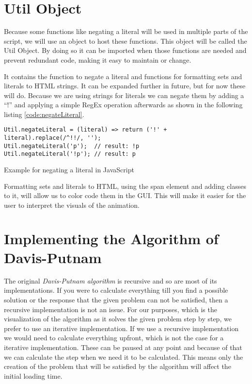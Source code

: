 \section{Util Object}
\label{sec:impUtil}
Because some functions like negating a literal will be used in multiple parts of the script, we will use an object to host these functions. This object will be called the Util Object. By doing so it can be imported when those functions are needed and prevent redundant code, making it easy to maintain or change.

It contains the function to negate a literal and functions for formatting sets and literals to HTML strings. It can be expanded further in future, but for now these will do.
Because we are using strings for literals we can negate them by adding a ``!'' and applying a simple RegEx operation afterwards as shown in the following listing \ref{code:negateLiteral}.

\begin{listing}[h!]
\begin{verbatim}
Util.negateLiteral = (literal) => return ('!' + literal).replace(/^!!/, '');
Util.negateLiteral('p');  // result: !p
Util.negateLiteral('!p'); // result: p
\end{verbatim}
    \caption{Example for negating a literal in JavaScript}
    \label{code:negateLiteral}
\end{listing}

Formatting sets and literals to HTML, using the span element and adding classes to it, will allow us to color code them in the GUI. This will make it easier for the user to interpret the visuals of the animation.

\section{Implementing the Algorithm of Davis-Putnam}
\label{sec:impDavisPutnam}
The original \textit{Davis-Putnam algorithm} is recursive and so are most of its implementations. If you were to calculate everything till you find a possible solution or the response that the given problem can not be satisfied, then a recursive implementation is not an issue. For our purposes, which is the visualization of the algorithm as it solves the given problem step by step, we prefer to use an iterative implementation. If we use a recursive implementation we would need to calculate everything upfront, which is not the case for a iterative implementation. These can be paused at any point and because of that we can calculate the step when we need it to be calculated. This means only the creation of the problem that will be satisfied by the algorithm will affect the initial loading time.

